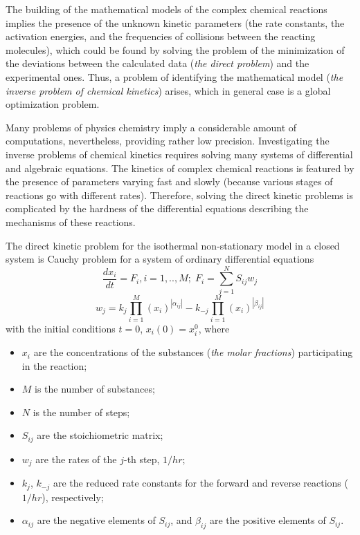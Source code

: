 The building of the mathematical models of the complex chemical reactions implies the presence of the unknown kinetic parameters (the rate constants, the activation energies, and the frequencies of collisions between the reacting molecules), which could be found by solving the problem of the minimization of the deviations between the calculated data (\textit{the direct problem}) and the experimental ones. Thus, a problem of identifying the mathematical model (\textit{the inverse problem of chemical kinetics}) arises, which in general case is a global optimization problem.

Many problems of physics chemistry imply a considerable amount of computations, nevertheless, providing rather low precision. Investigating the inverse problems of chemical kinetics requires solving many systems of differential and algebraic equations. The kinetics of complex chemical reactions is featured by the presence of parameters varying fast and slowly (because various stages of reactions go with different rates). Therefore, solving the direct kinetic problems is complicated by the hardness of the differential equations describing the mechanisms of these reactions.

The direct kinetic problem for the isothermal non-stationary model in a closed system is Cauchy problem for a system of ordinary differential equations
\begin{equation} 
 \frac{dx_i}{dt}= F_i, i=1,..,M; \; F_i=\sum_{j=1}^{N}{S_{ij}w_j}
\end{equation}
\begin{equation} 
 w_j=k_j\prod_{i=1}^{M}{\left(x_i\right)^{\left|\alpha_{ij}\right|}}-k_{-j}\prod_{i=1}^{M}{\left(x_i\right)^{\left|\beta_{ij}\right|}}
\end{equation}
with the initial conditions $t=0$, $x_i(0)=x_i^0$, where 
\begin{itemize}
	\item $x_i$ are the concentrations of the substances (\textit{the molar fractions}) participating in the reaction;
	\item $M$ is the number of substances; 
	\item $N$ is the number of steps;
	\item $S_{ij}$ are the stoichiometric matrix; 
	\item $w_j$ are the rates of the $j$-th step, $1/{hr}$; 
	\item $k_j$, $k_{-j}$ are the reduced rate constants for the forward and reverse reactions ($1/{hr}$), respectively;
	\item $\alpha_{ij}$ are the negative elements of $S_{ij}$, and $\beta_{ij}$ are the positive elements of $S_{ij}$.
\end{itemize}

